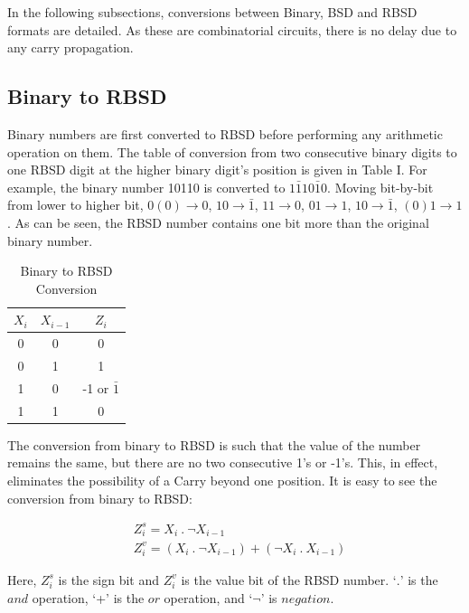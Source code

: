 \documentclass[conference]{IEEEtran}
\begin{document}
In the following subsections, conversions between Binary, BSD and RBSD formats are detailed. As these are combinatorial circuits, there is no delay due to any carry propagation.

\subsection{Binary to RBSD}

Binary numbers are first converted to RBSD before performing any arithmetic operation on them. The table of conversion from two consecutive binary digits to one RBSD digit at the higher binary digit’s position is given in Table I. For example, the binary number 10110 is converted to $1\bar{1}10\bar{1}0$. Moving bit-by-bit from lower to higher bit, $0(0) \to 0$, $10 \to \bar{1}$, $11 \to 0$, $01 \to 1$, $10 \to \bar{1}$, $(0)1 \to 1$. As can be seen, the RBSD number contains one bit more than the original binary number.

\vspace{-.5em}
\begin{table}[h!]
  \centering
  \caption{Binary to RBSD Conversion}
  \label{tab:table1}
  \begin{tabular}{|c|c||c|}
    \hline
    $X_{i}$ & $X_{i-1}$ & $Z_{i}$ \\
    \hline
    \hline
    0 & 0 & 0\\
    \hline
    0 & 1 & 1\\
    \hline
    1 & 0 & -1 or $\bar{1}$\\
    \hline
    1 & 1 & 0\\
    \hline
  \end{tabular}
\end{table}

The conversion from binary to RBSD is such that the value of the number remains the same, but there are no two consecutive 1’s or -1’s. This, in effect, eliminates the possibility of a Carry beyond one position. It is easy to see the conversion from binary to RBSD:

\vspace{-1em}
\begin{align}
&Z_{i}^{s} = X_{i} \ . \ \neg X_{i-1} \\
&Z_{i}^{v} = (X_{i} \ . \ \neg X_{i-1}) + (\neg X_{i} \ . \ X_{i-1})
\end{align}

Here, $Z_{i}^{s}$ is the sign bit and $Z_{i}^{v}$  is the value bit of the RBSD number. `$.$' is the $and$ operation, `+' is the $or$ operation, and `$\neg$' is $negation$.
\end{document}
